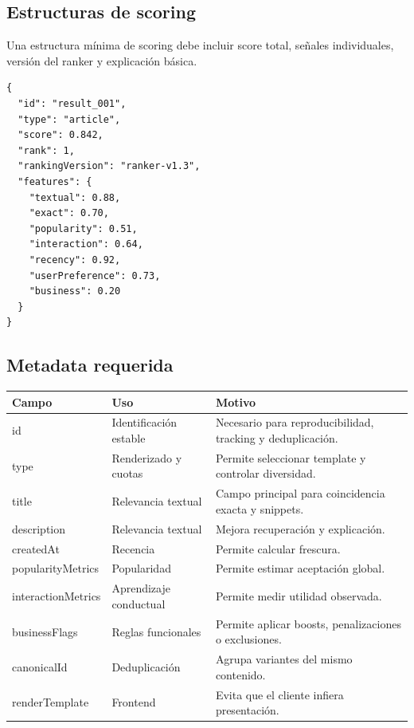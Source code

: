 \documentclass[12pt,a4paper]{article}
\begin{document}
\subsection{Estructuras de scoring}

Una estructura mínima de scoring debe incluir score total, señales individuales, versión del ranker y explicación básica.

\begin{lstlisting}[caption={Estructura de scoring recomendada}]
{
  "id": "result_001",
  "type": "article",
  "score": 0.842,
  "rank": 1,
  "rankingVersion": "ranker-v1.3",
  "features": {
    "textual": 0.88,
    "exact": 0.70,
    "popularity": 0.51,
    "interaction": 0.64,
    "recency": 0.92,
    "userPreference": 0.73,
    "business": 0.20
  }
}
\end{lstlisting}

\subsection{Metadata requerida}

\begin{longtable}{p{4cm}p{4cm}p{6cm}}
\toprule
\textbf{Campo} & \textbf{Uso} & \textbf{Motivo} \\
\midrule
\endhead

id & Identificación estable & Necesario para reproducibilidad, tracking y deduplicación. \\

type & Renderizado y cuotas & Permite seleccionar template y controlar diversidad. \\

title & Relevancia textual & Campo principal para coincidencia exacta y snippets. \\

description & Relevancia textual & Mejora recuperación y explicación. \\

createdAt & Recencia & Permite calcular frescura. \\

popularityMetrics & Popularidad & Permite estimar aceptación global. \\

interactionMetrics & Aprendizaje conductual & Permite medir utilidad observada. \\

businessFlags & Reglas funcionales & Permite aplicar boosts, penalizaciones o exclusiones. \\

canonicalId & Deduplicación & Agrupa variantes del mismo contenido. \\

renderTemplate & Frontend & Evita que el cliente infiera presentación. \\

\bottomrule
\end{longtable}
\end{document}
